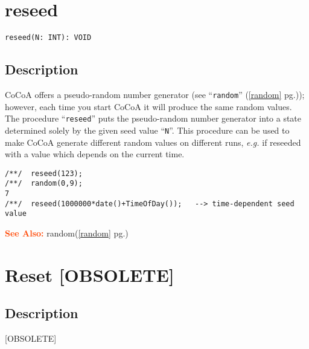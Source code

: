 \documentclass[a4paper]{mybook}
\newenvironment{command}{}{} %
\newcommand\SeeAlso{\par\textcolor{OrangeRed}{\textbf{\large See Also: }}}
\begin{document}
\section{reseed}
\label{reseed}
\begin{command} %


\begin{Verbatim}[label=syntax, rulecolor=\color{MidnightBlue},
frame=single]
reseed(N: INT): VOID
\end{Verbatim}


\subsection*{Description}

CoCoA offers a pseudo-random number generator (see ``\verb&random&'' (\ref{random} pg.\pageref{random})); however,
each time you start CoCoA it will produce the same random values.  The
procedure ``\verb&reseed&'' puts the pseudo-random number generator into a state
determined solely by the given seed value ``\verb&N&''.  This procedure can be
used to make CoCoA generate different random values on different runs,
\textit{e.g.} if reseeded with a value which depends on the current time.
\begin{Verbatim}[label=example, rulecolor=\color{PineGreen}, frame=single]
/**/  reseed(123);
/**/  random(0,9);
7
/**/  reseed(1000000*date()+TimeOfDay());   --> time-dependent seed value
\end{Verbatim}


\SeeAlso %
  random(\ref{random} pg.\pageref{random})
\end{command} %

\section{Reset [OBSOLETE]}
\label{Reset [OBSOLETE]}
\begin{command} %



\subsection*{Description}

[OBSOLETE]

\end{command} %
\end{document}
